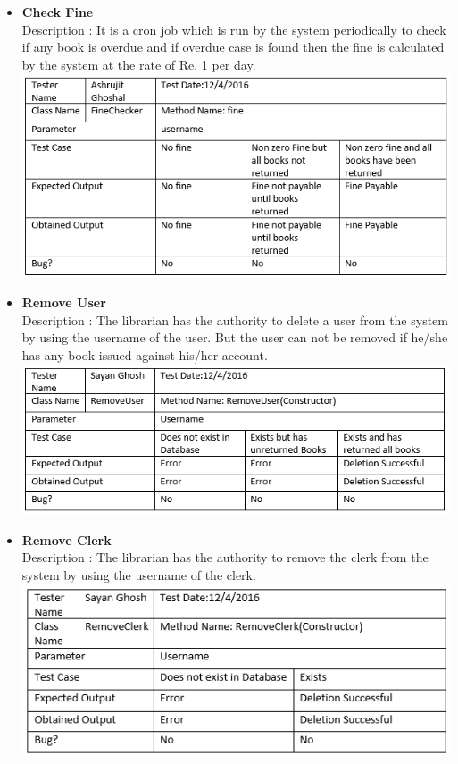 \documentclass{article}
\begin{document}
\begin{itemize}
	\item \textbf{Check Fine} \\
	Description : It is a cron job which is run by the system periodically to check if any book is overdue and if overdue case is found then the fine is calculated by the system at the rate of Re. 1 per day.\\
	\includegraphics[scale=0.5]{images/Tables/FineChecker.PNG}
	
	\item \textbf{Remove User} \\
	Description : The librarian has the authority to delete a user from the system by using the username of the user. But the user can not be removed if he/she has any book issued against his/her account.\\
	\includegraphics[scale=0.8]{images/Tables/RemoveUser.PNG}
	
	\item \textbf{Remove Clerk} \\
	Description : The librarian has the authority to remove the clerk from the system by using the username of the clerk.\\
	\includegraphics[scale=0.8]{images/Tables/RemoveClerk.PNG}
	

\end{itemize}
\end{document}
